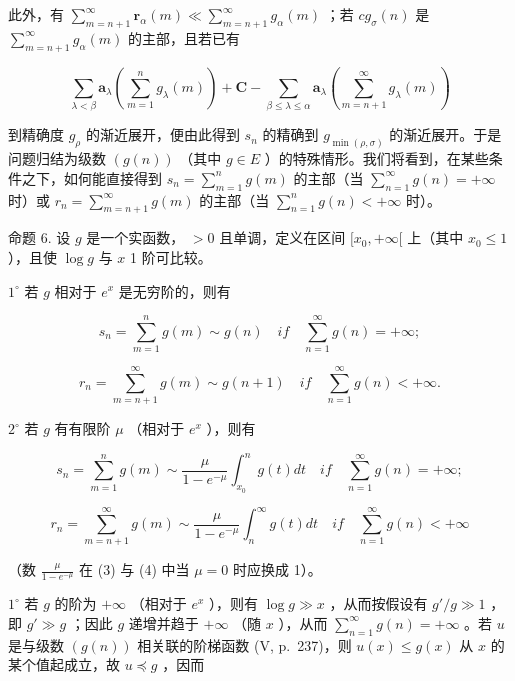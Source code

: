 此外，有 \(\sum_{m=n+1}^{\infty}\mathbf{r}_{\alpha}(m)\ll\sum_{m=n+1}^{\infty}g_{\alpha}(m)\) ；若 \(cg_{\sigma}(n)\) 是 \(\sum_{m=n+1}^{\infty}g_{\alpha}(m)\) 的主部，且若已有

\[
\sum_ {\lambda <   \beta} \mathbf {a} _ {\lambda} \left(\sum_ {m = 1} ^ {n} g _ {\lambda} (m)\right) + \mathbf {C} - \sum_ {\beta \leqslant \lambda \leqslant \alpha} \mathbf {a} _ {\lambda} \left(\sum_ {m = n + 1} ^ {\infty} g _ {\lambda} (m)\right)
\]

到精确度 \(g_{\rho}\) 的渐近展开，便由此得到 \(s_{n}\) 的精确到 \(g_{\min(\rho,\sigma)}\) 的渐近展开。于是问题归结为级数 \((g(n))\) （其中 \(g \in E\) ）的特殊情形。我们将看到，在某些条件之下，如何能直接得到 \(s_{n} = \sum_{m=1}^{n} g(m)\) 的主部（当 \(\sum_{n=1}^{\infty} g(n) = +\infty\) 时）或 \(r_{n} = \sum_{m=n+1}^{\infty} g(m)\) 的主部（当 \(\sum_{n=1}^{n} g(n) < +\infty\) 时）。

命题 6. 设 \(g\) 是一个实函数， \(>0\) 且单调，定义在区间 \([x_0, +\infty[\) 上（其中 \(x_0 \leqslant 1\) ），且使 \(\log g\) 与 \(x\) 1 阶可比较。

\(1^{\circ}\) 若 \(g\) 相对于 \(e^{x}\) 是无穷阶的，则有

\[
s _ {n} = \sum_ {m = 1} ^ {n} g (m) \sim g (n) \quad i f \quad \sum_ {n = 1} ^ {\infty} g (n) = + \infty ;\tag{1}
\]

\[
r _ {n} = \sum_ {m = n + 1} ^ {\infty} g (m) \sim g (n + 1) \quad i f \quad \sum_ {n = 1} ^ {\infty} g (n) <   + \infty .\tag{2}
\]

\(2^{\circ}\) 若 \(g\) 有有限阶 \(\mu\) （相对于 \(e^{x}\) ），则有

\[
s _ {n} = \sum_ {m = 1} ^ {n} g (m) \sim \frac {\mu}{1 - e ^ {- \mu}} \int_ {x _ {0}} ^ {n} g (t) d t \quad i f \quad \sum_ {n = 1} ^ {\infty} g (n) = + \infty ;\tag{3}
\]

\[
r _ {n} = \sum_ {m = n + 1} ^ {\infty} g (m) \sim \frac {\mu}{1 - e ^ {- \mu}} \int_ {n} ^ {\infty} g (t) d t \quad i f \quad \sum_ {n = 1} ^ {\infty} g (n) <   + \infty\tag{4}
\]

（数 \(\frac{\mu}{1 - e^{-\mu}}\) 在 (3) 与 (4) 中当 \(\mu = 0\) 时应换成 1）。

\(1^{\circ}\) 若 \(g\) 的阶为 \(+\infty\) （相对于 \(e^{x}\) ），则有 \(\log g \gg x\) ，从而按假设有 \(g' / g \gg 1\) ，即 \(g' \gg g\) ；因此 \(g\) 递增并趋于 \(+\infty\) （随 \(x\) ），从而 \(\sum_{n=1}^{\infty} g(n) = +\infty\) 。若 \(u\) 是与级数 \((g(n))\) 相关联的阶梯函数 (V, p.~237)，则 \(u(x) \leqslant g(x)\) 从 \(x\) 的某个值起成立，故 \(u \preccurlyeq g\) ，因而

